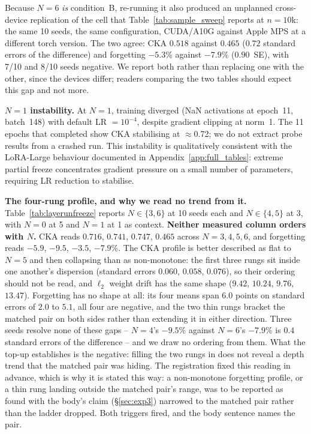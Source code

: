 Because $N{=}6$ \emph{is} condition~B, re-running it also produced an unplanned
cross-device replication of the cell that
Table~\ref{tab:sample_sweep} reports at $n{=}10$k: the same 10 seeds, the same
configuration, CUDA/A10G against Apple MPS at a different torch version.  The two
agree: CKA $0.518$ against $0.465$ ($0.72$ standard errors of the difference) and
forgetting $-5.3$\% against $-7.9$\% ($0.90$~SE), with 7/10 and 8/10 seeds
negative.  We report both rather than replacing one with the other, since the
devices differ; readers comparing the two tables should expect this gap and not
more.

\textbf{$N{=}1$ instability.}
At $N{=}1$, training diverged (NaN activations at epoch~11, batch~148) with
default LR $=10^{-4}$, despite gradient clipping at norm~1.  The 11 epochs that
completed show CKA stabilising at $\approx$0.72; we do not extract probe results
from a crashed run.  This instability is qualitatively consistent with the
LoRA-Large behaviour documented in Appendix~\ref{app:full_tables}: extreme
partial freeze concentrates gradient pressure on a small number of parameters,
requiring LR reduction to stabilise.

\textbf{The four-rung profile, and why we read no trend from it.}
Table~\ref{tab:layerunfreeze} reports $N{\in}\{3,6\}$ at 10 seeds each and
$N{\in}\{4,5\}$ at 3, with $N{=}0$ at 5 and $N{=}1$ at 1 as context.
\textbf{Neither measured column orders with $N$.}  CKA reads $0.716$, $0.741$,
$0.747$, $0.465$ across $N{=}3,4,5,6$, and forgetting reads $-5.9$, $-9.5$,
$-3.5$, $-7.9$\%.  The CKA profile is better described as flat to $N{=}5$ and then
collapsing than as non-monotone: the first three rungs sit inside one another's
dispersion (standard errors $0.060$, $0.058$, $0.076$), so their ordering should
not be read, and $\ell_2$ weight drift has the same shape ($9.42$, $10.24$,
$9.76$, $13.47$).  Forgetting has no shape at all: its four means span $6.0$
points on standard errors of $2.0$ to $5.1$, all four are negative, and the two
thin rungs bracket the matched pair on both sides rather than extending it in
either direction.  Three seeds resolve none of these gaps -- $N{=}4$'s $-9.5$\%
against $N{=}6$'s $-7.9$\% is $0.4$ standard errors of the difference -- and we
draw no ordering from them.  What the top-up establishes is the negative: filling
the two rungs in does not reveal a depth trend that the matched pair was hiding.
The registration fixed this reading in advance, which is why it is stated this
way: a non-monotone forgetting profile, or a thin rung landing outside the matched
pair's range, was to be reported as found with the body's claim
(\S\ref{sec:exp3}) narrowed to the matched pair rather than the ladder dropped.
Both triggers fired, and the body sentence names the pair.

